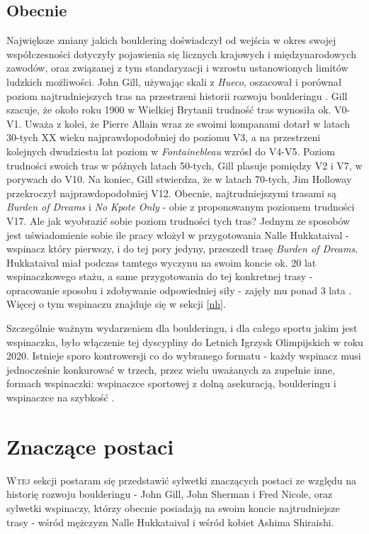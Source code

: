 \documentclass{article}
\begin{document}
\subsection{Obecnie}
Największe zmiany jakich bouldering doświadczył od wejścia w okres swojej współczesności dotyczyły pojawienia się licznych krajowych i międzynarodowych zawodów, oraz związanej z tym standaryzacji i wzrostu ustanowionych limitów ludzkich możliwości. John Gill, używając skali z \textit{Hueco}, oszacował i porównał poziom najtrudniejszych tras na przestrzeni historii rozwoju boulderingu \cite{gill-history-1}. Gill szacuje, że około roku 1900 w Wielkiej Brytanii trudność tras wynosiła ok. V0-V1. Uważa z kolei, że Pierre Allain wraz ze swoimi kompanami dotarł w latach 30-tych XX wieku najprawdopodobniej do poziomu V3, a na przestrzeni kolejnych dwudziestu lat poziom w \textit{Fontainebleau} wzrósł do V4-V5. Poziom trudności swoich tras w późnych latach 50-tych, Gill plasuje pomiędzy V2 i V7, w porywach do V10. Na koniec, Gill stwierdza, że w latach 70-tych, Jim Holloway przekroczył najprawdopodobniej V12. Obecnie, najtrudniejszymi trasami są \textit{Burden of Dreams} i \textit{No Kpote Only} - obie z proponowanym poziomem trudności V17. Ale jak wyobrazić sobie poziom trudności tych tras? Jednym ze sposobów jest uświadomienie sobie ile pracy włożył w przygotowania Nalle Hukkataival - wspinacz który pierwszy, i do tej pory jedyny, przeszedł trasę \textit{Burden of Dreams}. Hukkataival miał podczas tamtego wyczynu na swoim koncie ok. 20 lat wspinaczkowego stażu, a same przygotowania do tej konkretnej trasy - opracowanie sposobu i zdobywanie odpowiedniej siły - zajęły mu ponad 3 lata \cite{hukkataival-yt}. Więcej o tym wspinaczu znajduje się w sekcji \ref{nh}. 

Szczególnie ważnym wydarzeniem dla boulderingu, i dla całego sportu jakim jest wspinaczka, było włączenie tej dyscypliny do Letnich Igrzysk Olimpijskich w roku 2020. Istnieje sporo kontrowersji co do wybranego formatu - każdy wspinacz musi jednocześnie konkurować w trzech, przez wielu uważanych za zupełnie inne, formach wspinaczki: wspinaczce sportowej z dolną asekuracją, boulderingu i wspinaczce na szybkość \cite{olympics}. 


\section{Znaczące postaci}
\lettrine[lines=2]{W}{tej} sekcji postaram się przedstawić sylwetki znaczących postaci ze względu na historię rozwoju boulderingu - John Gill, John Sherman i Fred Nicole, oraz sylwetki wspinaczy, którzy obecnie posiadają na swoim koncie najtrudniejsze trasy - wśród mężczyzn Nalle Hukkataival i wśród kobiet Ashima Shiraishi. 
\end{document}
